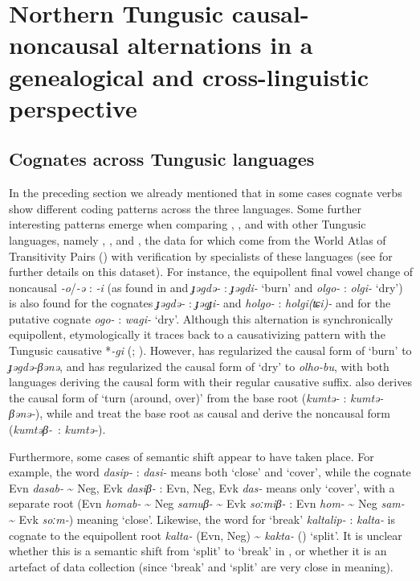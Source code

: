 \documentclass[output=paper,colorlinks,citecolor=brown]{langscibook}
\begin{document}
\section{Northern Tungusic causal-noncausal alternations in a genealogical and cross-linguistic perspective}\label{section2.5}

\subsection{Cognates across Tungusic languages}

In the preceding section we already mentioned that in some cases cognate verbs show different coding patterns across the three  languages. Some further interesting patterns emerge when comparing , , and  with other Tungusic languages, namely , , and , the data for which come from the World Atlas of Transitivity Pairs (\citeyear{Atlas2014}) with verification by specialists of these languages  (see  for further details on this dataset). For instance, the equipollent final vowel change of noncausal \textit{-o}/\textit{-ə} : \textit{-i} (as found in  and  \textit{ɟəgdə-} : \textit{ɟəgdi-} ‘burn’ and \textit{olgo-} : \textit{olgi-} ‘dry’) is also found for the  cognates \textit{ɟəgdə-} : \textit{ɟəgɟi-} and \textit{holgo-} : \textit{holgi(ʨi)-} and for the putative  cognate \textit{ogo-} : \textit{wagi-} `dry'. Although this alternation is synchronically equipollent, etymologically it traces back to a causativizing pattern with the Tungusic causative *\textit{-gi} (\citealt[122]{Benzing1955AP}; \citealt[93]{Sunik1962}). However,  has regularized the causal form of ‘burn’ to \textit{ɟəgdə-βənə}, and  has regularized the causal form of ‘dry’ to \textit{olho-bu}, with both languages deriving the causal form with their regular causative suffix.  also derives the causal form of ‘turn (around, over)’ from the base root (\textit{kumtə-} : \textit{kumtə-βənə-}), while  and  treat the base root as causal and derive the noncausal form (\textit{kumtəβ-}~: \textit{kumtə-}).

Furthermore, some cases of semantic shift appear to have taken place. For example, the  word \textit{dasip-} : \textit{dasi-} means both ‘close’ and ‘cover’, while the  cognate Evn \textit{dasab-} {\textasciitilde} Neg, Evk \textit{dasiβ-} : Evn, Neg, Evk \textit{das-} means only ‘cover’, with a separate root (Evn \textit{homab-} {\textasciitilde} Neg \textit{samuβ-} {\textasciitilde} Evk \textit{soːmiβ-} : Evn \textit{hom-} {\textasciitilde} Neg \textit{sam-} {\textasciitilde} Evk \textit{soːm-}) meaning ‘close’. Likewise, the  word for ‘break’ \textit{kaltalip-} : \textit{kalta-} is cognate to the equipollent root \textit{kalta-} (Evn, Neg) {\textasciitilde} \textit{kakta-} () ‘split’. It is unclear whether this is a semantic shift from ‘split’ to ‘break’ in , or whether it is an artefact of data collection (since ‘break’ and ‘split’ are very close in meaning).
\end{document}
